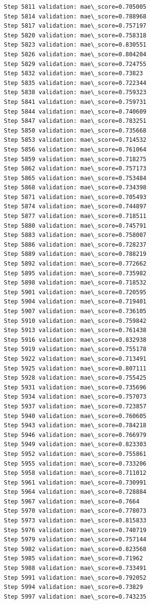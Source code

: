 \documentclass[11pt]{article}
\begin{document}
\begin{Verbatim}[commandchars=\\\{\}]
Step 5811 validation: mae\_score=0.705005
Step 5814 validation: mae\_score=0.788968
Step 5817 validation: mae\_score=0.757197
Step 5820 validation: mae\_score=0.758318
Step 5823 validation: mae\_score=0.830551
Step 5826 validation: mae\_score=0.804204
Step 5829 validation: mae\_score=0.724755
Step 5832 validation: mae\_score=0.73823
Step 5835 validation: mae\_score=0.722344
Step 5838 validation: mae\_score=0.759323
Step 5841 validation: mae\_score=0.759731
Step 5844 validation: mae\_score=0.740609
Step 5847 validation: mae\_score=0.783251
Step 5850 validation: mae\_score=0.735668
Step 5853 validation: mae\_score=0.714532
Step 5856 validation: mae\_score=0.761064
Step 5859 validation: mae\_score=0.718275
Step 5862 validation: mae\_score=0.757173
Step 5865 validation: mae\_score=0.753484
Step 5868 validation: mae\_score=0.734398
Step 5871 validation: mae\_score=0.705493
Step 5874 validation: mae\_score=0.744897
Step 5877 validation: mae\_score=0.718511
Step 5880 validation: mae\_score=0.745791
Step 5883 validation: mae\_score=0.758007
Step 5886 validation: mae\_score=0.728237
Step 5889 validation: mae\_score=0.788219
Step 5892 validation: mae\_score=0.772662
Step 5895 validation: mae\_score=0.735982
Step 5898 validation: mae\_score=0.718532
Step 5901 validation: mae\_score=0.720595
Step 5904 validation: mae\_score=0.719401
Step 5907 validation: mae\_score=0.736105
Step 5910 validation: mae\_score=0.759842
Step 5913 validation: mae\_score=0.761438
Step 5916 validation: mae\_score=0.832938
Step 5919 validation: mae\_score=0.755178
Step 5922 validation: mae\_score=0.713491
Step 5925 validation: mae\_score=0.807111
Step 5928 validation: mae\_score=0.755425
Step 5931 validation: mae\_score=0.735696
Step 5934 validation: mae\_score=0.757073
Step 5937 validation: mae\_score=0.723857
Step 5940 validation: mae\_score=0.760605
Step 5943 validation: mae\_score=0.784218
Step 5946 validation: mae\_score=0.766979
Step 5949 validation: mae\_score=0.823303
Step 5952 validation: mae\_score=0.755861
Step 5955 validation: mae\_score=0.733206
Step 5958 validation: mae\_score=0.711012
Step 5961 validation: mae\_score=0.730991
Step 5964 validation: mae\_score=0.728884
Step 5967 validation: mae\_score=0.7664
Step 5970 validation: mae\_score=0.778073
Step 5973 validation: mae\_score=0.815833
Step 5976 validation: mae\_score=0.740719
Step 5979 validation: mae\_score=0.757144
Step 5982 validation: mae\_score=0.823568
Step 5985 validation: mae\_score=0.71962
Step 5988 validation: mae\_score=0.733491
Step 5991 validation: mae\_score=0.792052
Step 5994 validation: mae\_score=0.73829
Step 5997 validation: mae\_score=0.743235

\end{Verbatim}
\end{document}
